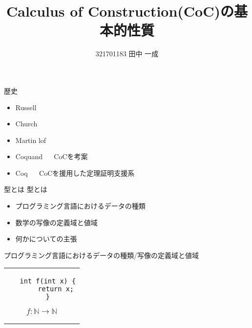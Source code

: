 \documentclass[18pt]{beamer}
\begin{document}
\theoremstyle{definition}
\newtheorem{defn}{定義}
\newtheorem{thm}{定理}
\newtheorem{lem}{補題}
\newtheorem{rem}{注意}
\newtheorem{cor}{系}
\newtheorem{ex}{例}
\renewcommand{\proofname}{\bf{証明}}

\title{Calculus of Construction(CoC)の基本的性質}
\author{321701183 田中 一成}

\frame{\maketitle}

\begin{frame}{歴史}
 \begin{itemize}
  \item Russell $\quad$ 
  \item Church $\quad$ 
  \item Martin lof
  \item Coquand $\quad$ CoCを考案
  \item Coq $\quad$ CoCを援用した定理証明支援系
 \end{itemize}
\end{frame}

\begin{frame}{型とは}
 型とは
 \begin{itemize}
  \item プログラミング言語におけるデータの種類
  \item 数学の写像の定義域と値域
  \item 何かについての主張
 \end{itemize}
\end{frame}

\begin{frame}[fragile]{プログラミング言語におけるデータの種類/写像の定義域と値域}
\begin{tabular}{c}
 \begin{minipage}{0.5\textwidth}
  \begin{verbatim}
   int f(int x) {
       return x;
   }
  \end{verbatim}
 \end{minipage}
 \begin{minipage}{0.5\textwidth}
 \[
 f \colon \mathbb{N} \rightarrow \mathbb{N}
 \]
 \end{minipage}
\end{tabular}
\end{frame}
\end{document}
